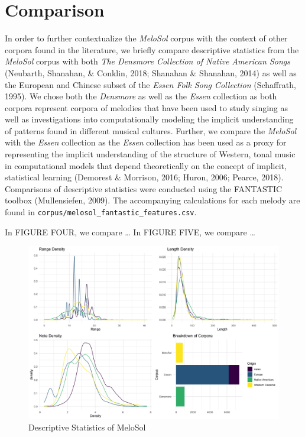 \documentclass[english,man]{apa6}
\begin{document}
\hypertarget{comparison}{%
\section{Comparison}\label{comparison}}

In order to further contextualize the \emph{MeloSol} corpus with the context of other corpora found in the literature, we briefly compare descriptive statistics from the \emph{MeloSol} corpus with both \emph{The Densmore Collection of Native American Songs} (Neubarth, Shanahan, \& Conklin, 2018; Shanahan \& Shanahan, 2014) as well as the European and Chinese subset of the \emph{Essen Folk Song Collection} (Schaffrath, 1995).
We chose both the \emph{Densmore} as well as the \emph{Essen} collection as both corpora represent corpora of melodies that have been used to study singing as well as investigations into computationally modeling the implicit understanding of patterns found in different musical cultures.
Further, we compare the \emph{MeloSol} with the \emph{Essen} collection as the \emph{Essen} collection has been used as a proxy for representing the implicit understanding of the structure of Western, tonal music in computational models that depend theoretically on the concept of implicit, statistical learning (Demorest \& Morrison, 2016; Huron, 2006; Pearce, 2018).
Comparisons of descriptive statistics were conducted using the FANTASTIC toolbox (Mullensiefen, 2009).
The accompanying calculations for each melody are found in \texttt{corpus/melosol\_fantastic\_features.csv}.

In FIGURE FOUR, we compare \ldots{}
In FIGURE FIVE, we compare \ldots{}

\begin{figure}
\centering
\includegraphics{../img/comparative_descriptive_panel.png}
\caption{Descriptive Statistics of MeloSol}
\end{figure}
\end{document}
